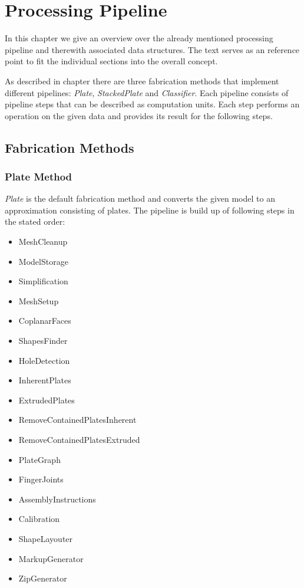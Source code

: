 \documentclass[../ClassicThesis.tex]{subfiles}
\begin{document}
\chapter{Processing Pipeline}\label{ch:processingPipeline}

In this chapter we give an overview over the already mentioned processing pipeline and therewith associated data structures. The text serves as an reference point to fit the individual sections into the overall concept.

As described in chapter  there are three fabrication methods that implement different pipelines: \emph{Plate}, \emph{StackedPlate} and \emph{Classifier}. Each pipeline consists of pipeline steps that can be described as computation units. Each step performs an operation on the given data and provides its result for the following steps.


\section{Fabrication Methods}

\subsection{Plate Method}

\emph{Plate} is the default fabrication method and converts the given model to an approximation consisting of plates. The pipeline is build up of following steps in the stated order: 

\begin{itemize}
    \item MeshCleanup
    \item ModelStorage
    \item Simplification
    \item MeshSetup
    \item CoplanarFaces
    \item ShapesFinder
    \item HoleDetection
    \item InherentPlates
    \item ExtrudedPlates
    \item RemoveContainedPlatesInherent
    \item RemoveContainedPlatesExtruded
    \item PlateGraph
    \item FingerJoints
    \item AssemblyInstructions
    \item Calibration
    \item ShapeLayouter
    \item MarkupGenerator
    \item ZipGenerator
\end{itemize}
\end{document}
